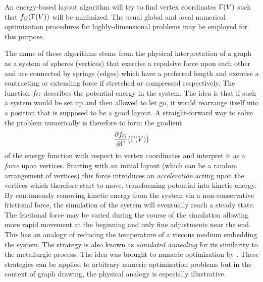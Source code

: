\documentclass{graphstudy}
\begin{document}
An energy-based layout algorithm will try to find vertex coordinates \(\Gamma(V)\) such that
\(f_G(\Gamma(V))\) will be minimized.  The usual global and local numerical optimization procedures for
highly-dimensional problems may be employed for this purpose.

The name of these algorithms stems from the physical interpretation of a graph as a system of spheres (vertices) that
exercise a repulsive force upon each other and are connected by springs (edges) which have a preferred length and
exercise a contracting or extending force if stretched or compressed respectively.  The function \(f_G\) describes
the potential energy in the system.  The idea is that if such a system would be set up and then allowed to let go, it
would rearrange itself into a position that is supposed to be a good layout.  A straight-forward way to solve the
problem numerically is therefore to form the gradient
\begin{equation}
  \frac{\partial f_G}{\partial \Gamma} \big(\Gamma(V)\big)
\end{equation}
of the energy function with respect to vertex coordinates and interpret it as a \emph{force} upon vertices.  Starting
with an initial layout (which can be a random arrangement of vertices) this force introduces an \emph{acceleration}
acting upon the vertices which therefore start to move, transforming potential into kinetic energy.  By continuously
removing kinetic energy from the system via a non-conservative frictional force, the simulation of the system will
eventually reach a steady state.  The frictional force may be varied during the course of the simulation allowing more
rapid movement at the beginning and only fine adjustments near the end.  This has an analogy of reducing the temperature
of a viscous medium embedding the system.  The strategy is also known as \emph{simulated annealing} for its similarity
to the metallurgic process.  The idea was brought to numeric optimization by \textcite{Kirkpatrick1983}.
These strategies can be applied to arbitrary numeric optimization problems but in the context of graph drawing, the
physical analogy is especially illustrative.
\end{document}
